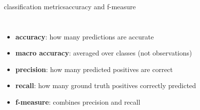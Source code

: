         \begin{frame}{classification metrics}{accuracy and f-measure}
            \begin{columns}
                    \begin{itemize}
                        \item<1-> \textbf{accuracy}: how many predictions are accurate
                        \item<2->   \textbf{macro accuracy}: averaged over classes (not observations)
                        \item<3->   \textbf{precision}: how many predicted positives are correct
                        \item<4->   \textbf{recall}: how many ground truth positives correctly predicted
                        \item<5->   \textbf{f-measure}: combines precision and recall
                    \end{itemize}
\end{columns}
\end{frame}
